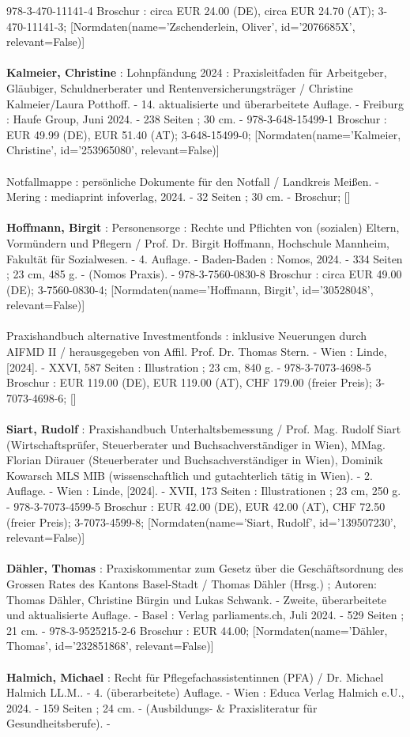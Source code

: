 \documentclass{article}
\begin{document}
\begin{multicols}{3}
978-3-470-11141-4 Broschur : circa EUR 24.00 (DE), circa EUR 24.70 (AT); 3-470-11141-3; [Normdaten(name='Zschenderlein, Oliver', id='2076685X', relevant=False)]\\\\\textbf{Kalmeier, Christine} : Lohnpfändung 2024 : Praxisleitfaden für Arbeitgeber, Gläubiger, Schuldnerberater und Rentenversicherungsträger / Christine Kalmeier/Laura Potthoff. - 14. aktualisierte und überarbeitete Auflage. - Freiburg : Haufe Group, Juni 2024. - 238 Seiten ; 30 cm. - 978-3-648-15499-1 Broschur : EUR 49.99 (DE), EUR 51.40 (AT); 3-648-15499-0; [Normdaten(name='Kalmeier, Christine', id='253965080', relevant=False)]\\\\Notfallmappe : persönliche Dokumente für den Notfall / Landkreis Meißen. - Mering : mediaprint infoverlag, 2024. - 32 Seiten ; 30 cm. - Broschur; []\\\\\textbf{Hoffmann, Birgit} : Personensorge : Rechte und Pflichten von (sozialen) Eltern, Vormündern und Pflegern / Prof. Dr. Birgit Hoffmann, Hochschule Mannheim, Fakultät für Sozialwesen. - 4. Auflage. - Baden-Baden : Nomos, 2024. - 334 Seiten ; 23 cm, 485 g. - (Nomos Praxis). - 978-3-7560-0830-8 Broschur : circa EUR 49.00 (DE); 3-7560-0830-4; [Normdaten(name='Hoffmann, Birgit', id='30528048', relevant=False)]\\\\Praxishandbuch alternative Investmentfonds : inklusive Neuerungen durch AIFMD II / herausgegeben von Affil. Prof. Dr. Thomas Stern. - Wien : Linde, [2024]. - XXVI, 587 Seiten : Illustration ; 23 cm, 840 g. - 978-3-7073-4698-5 Broschur : EUR 119.00 (DE), EUR 119.00 (AT), CHF 179.00 (freier Preis); 3-7073-4698-6; []\\\\\textbf{Siart, Rudolf} : Praxishandbuch Unterhaltsbemessung / Prof. Mag. Rudolf Siart (Wirtschaftsprüfer, Steuerberater und Buchsachverständiger in Wien), MMag. Florian Dürauer (Steuerberater und Buchsachverständiger in Wien), Dominik Kowarsch MLS MIB (wissenschaftlich und gutachterlich tätig in Wien). - 2. Auflage. - Wien : Linde, [2024]. - XVII, 173 Seiten : Illustrationen ; 23 cm, 250 g. - 978-3-7073-4599-5 Broschur : EUR 42.00 (DE), EUR 42.00 (AT), CHF 72.50 (freier Preis); 3-7073-4599-8; [Normdaten(name='Siart, Rudolf', id='139507230', relevant=False)]\\\\\textbf{Dähler, Thomas} : Praxiskommentar zum Gesetz über die Geschäftsordnung des Grossen Rates des Kantons Basel-Stadt / Thomas Dähler (Hrsg.) ; Autoren: Thomas Dähler, Christine Bürgin und Lukas Schwank. - Zweite, überarbeitete und aktualisierte Auflage. - Basel : Verlag parliaments.ch, Juli 2024. - 529 Seiten ; 21 cm. - 978-3-9525215-2-6 Broschur : EUR 44.00; [Normdaten(name='Dähler, Thomas', id='232851868', relevant=False)]\\\\\textbf{Halmich, Michael} : Recht für Pflegefachassistentinnen (PFA) / Dr. Michael Halmich LL.M.. - 4. (überarbeitete) Auflage. - Wien : Educa Verlag Halmich e.U., 2024. - 159 Seiten ; 24 cm. - (Ausbildungs- \& Praxisliteratur für Gesundheitsberufe). - 
\end{multicols}
\end{document}
